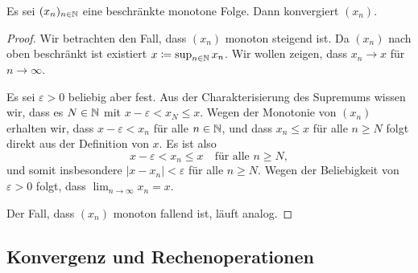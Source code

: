 \documentclass[a4paper,10pt]{article}
\begin{document}
\begin{prop}
 Es sei $(x_n)_{n \in \mathbb{N}}$ eine beschränkte monotone Folge. Dann konvergiert $(x_n)$.
\end{prop}
\begin{proof}
 Wir betrachten den Fall, dass $(x_n)$ monoton steigend ist. Da $(x_n)$ nach oben beschränkt ist existiert $x \coloneqq \sup_{n \in \mathbb{N}} x_n$. Wir wollen zeigen, dass $x_n \to x$ für $n \to \infty$.
 
 Es sei $\varepsilon > 0$ beliebig aber fest. Aus der Charakterisierung des Supremums wissen wir, dass es $N \in \mathbb{N}$ mit $x - \varepsilon < x_N \leq x$. Wegen der Monotonie von $(x_n)$ erhalten wir, dass $x - \varepsilon < x_n$ für alle $n \in \mathbb{N}$, und dass $x_n \leq x$ für alle $n \geq N$ folgt direkt aus der Definition von $x$. Es ist also
 \[
  x - \varepsilon < x_n \leq x \quad \text{für alle $n \geq N$},
 \]
 und somit insbesondere $|x - x_n| < \varepsilon$ für alle $n \geq N$. Wegen der Beliebigkeit von $\varepsilon > 0$ folgt, dass $\lim_{n \to \infty} x_n = x$.
 
 Der Fall, dass $(x_n)$ monoton fallend ist, läuft analog.
\end{proof}





\subsection{Konvergenz und Rechenoperationen}
\end{document}
